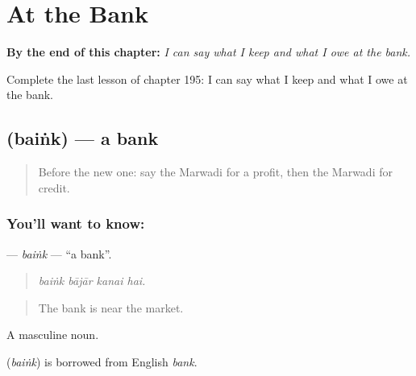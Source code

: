 
\chapter{At the Bank}
\label{ch:mw-at-the-bank}

\begin{chapteropening}
\textbf{By the end of this chapter:} \emph{I can say what I keep and what I owe at the bank.}

Complete the last lesson of chapter 195: I can say what I keep and what I owe at the bank.
\end{chapteropening}

\section[\texorpdfstring{\mw{बैंक} (baiṅk)}{बैंक (baiṅk)}]{ (baiṅk) — a bank}

\label{lesson:MW-C195-baink}



\begin{quote}
Before the new one: say the Marwadi for a profit, then the Marwadi for credit.
\end{quote}

\subsection*{You'll want to know: }
\textbf{} — \emph{baiṅk} — \textquotedblleft{}a bank\textquotedblright{}.

\begin{quote}
   
\end{quote}

\begin{quote}
\emph{baiṅk bājār kanai hai.}
\end{quote}

\begin{quote}
The bank is near the market.
\end{quote}

A masculine noun.

\begin{cousinweb}
\textbf{} (\emph{baiṅk}) is borrowed from English \emph{bank}.
\end{cousinweb}

